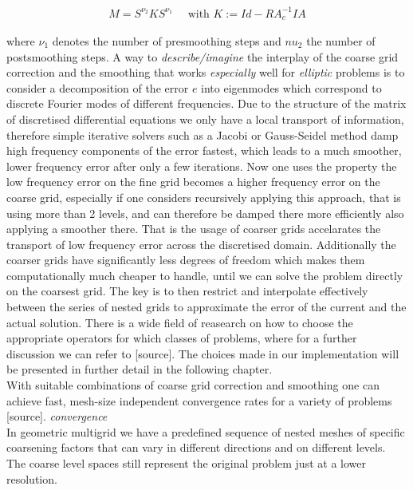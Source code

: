 \documentclass[../draft_1.tex]{subfiles}
\begin{document}
\begin{ceqn}
	\begin{align}
\label{two_level_iteration_operator}
M = S^{\nu_2} K S^{\nu_1} \quad \text{ with } K := Id - R A_c^{-1} I A
	\end{align}
\end{ceqn}
where $\nu_1$ denotes the number of presmoothing steps and $nu_2$ the number of postsmoothing steps. A way to \textit{describe/imagine} the interplay of the coarse grid correction and the smoothing that works \textit{especially} well for \textit{elliptic} problems is to consider a decomposition of the error $e$ into eigenmodes which correspond to discrete Fourier modes of different frequencies. Due to the structure of the matrix of discretised differential equations we only have a local transport of information, therefore simple iterative solvers such as a Jacobi or Gauss-Seidel method damp high frequency components of the error fastest, which leads to a much smoother, lower frequency error after only a few iterations. Now one uses the property the low frequency error on the fine grid becomes a higher frequency error on the coarse grid, especially if one considers recursively applying this approach, that is using more than 2 levels, and can therefore be damped there more efficiently also applying a smoother there. That is the usage of coarser grids accelarates the transport of low frequency error across the discretised domain. Additionally the coarser grids have significantly less degrees of freedom which makes them computationally much cheaper to handle, until we can solve the problem directly on the coarsest grid. The key is to then restrict and interpolate effectively between the series of nested grids to approximate the error of the current and the actual solution. There is a wide field of reasearch on how to choose the appropriate operators for which classes of problems, where for a further discussion we can refer to [source]. The choices made in our implementation will be presented in further detail in the following chapter. 
\smallskip
\\
With suitable combinations of coarse grid correction and smoothing one can achieve fast, mesh-size independent convergence rates for a variety of problems [source]. \textit{convergence}
\smallskip
\\
In geometric multigrid we have a predefined sequence of nested meshes of specific coarsening factors that can vary in different directions and on different levels. The coarse level spaces still represent the original problem just at a lower resolution. 
\end{document}
